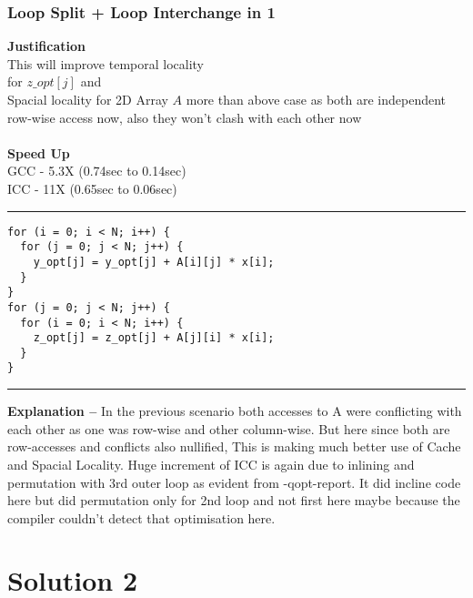 \documentclass[a4paper]{article}
\begin{document}
\subsubsection{\large\bf Loop Split + Loop Interchange in 1}
\begin{minipage}{0.4\textwidth}
{\bf Justification} \\
This will improve temporal locality  \\ for $z\_opt[j]$  and \\
Spacial locality for 2D Array $A$ more than above case as both are independent row-wise access now, also they won't clash with each other now\\ \\
{\bf Speed Up} \\
GCC - 5.3X (0.74sec to 0.14sec)\\ 
ICC - 11X (0.65sec to 0.06sec)\\
\end{minipage}
\begin{minipage}{0.6\textwidth}
\hrule
\begin{lstlisting}
for (i = 0; i < N; i++) {
  for (j = 0; j < N; j++) {
    y_opt[j] = y_opt[j] + A[i][j] * x[i];
  }
}
for (j = 0; j < N; j++) {
  for (i = 0; i < N; i++) {
    z_opt[j] = z_opt[j] + A[j][i] * x[i];
  }
}
\end{lstlisting}
\hrule 
\end{minipage}
\vspace{0.2cm}
\newline
{\bf Explanation -- } In the previous scenario both accesses to A were conflicting with each other as one was row-wise and other column-wise. But here since both are row-accesses and conflicts also nullified, This is making much better use of Cache and Spacial Locality. Huge increment of ICC is again due to inlining and permutation with 3rd outer loop as evident from -qopt-report. It did incline code here but did permutation only for 2nd loop and not first here maybe because the compiler couldn't detect that optimisation here. \\


\newpage





\section{\Huge Solution 2}
\vspace{0.5cm}
\end{document}
